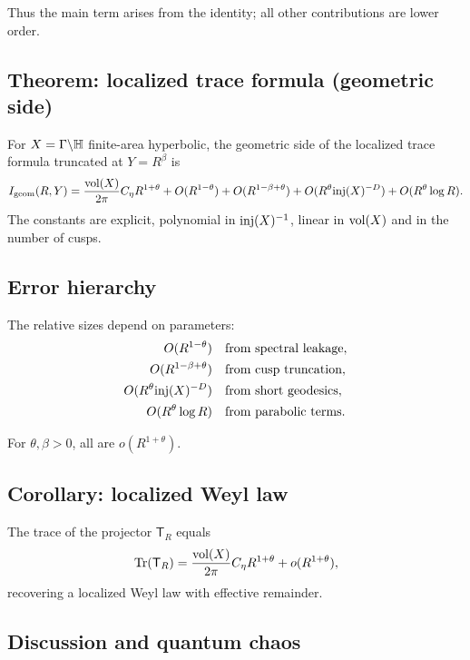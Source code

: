 Thus the main term arises from the identity; all other contributions are lower order.

\subsection{Theorem: localized trace formula (geometric side)}\label{subsec:geom-mainthm}

\begin{theorem}
For $X=\Gamma\backslash\mathbb{H}$ finite-area hyperbolic, the geometric side of the localized trace formula truncated at $Y=R^\beta$ is
\[
I_{\mathrm{geom}}(R,Y) = \frac{\operatorname{vol}(X)}{2\pi} C_\eta R^{1+\theta} + O(R^{1-\theta}) + O(R^{1-\beta+\theta}) + O(R^\theta\mathrm{inj}(X)^{-D}) + O(R^\theta\log R).
\]
The constants are explicit, polynomial in $\mathrm{inj}(X)^{-1}$, linear in $\operatorname{vol}(X)$ and in the number of cusps.
\end{theorem}

\subsection{Error hierarchy}\label{subsec:geom-errors}

The relative sizes depend on parameters:
\[
\begin{aligned}
O(R^{1-\theta}) &\quad\text{from spectral leakage},\\
O(R^{1-\beta+\theta}) &\quad\text{from cusp truncation},\\
O(R^\theta\mathrm{inj}(X)^{-D}) &\quad\text{from short geodesics},\\
O(R^\theta\log R) &\quad\text{from parabolic terms}.
\end{aligned}
\]

For $\theta,\beta>0$, all are $o(R^{1+\theta})$.

\subsection{Corollary: localized Weyl law}\label{subsec:geom-weyl}

The trace of the projector $\mathsf{T}_R$ equals
\[
\mathrm{Tr}(\mathsf{T}_R)=\frac{\operatorname{vol}(X)}{2\pi} C_\eta R^{1+\theta}+o(R^{1+\theta}),
\]
recovering a localized Weyl law with effective remainder.

\subsection{Discussion and quantum chaos}\label{subsec:geom-discussion}

